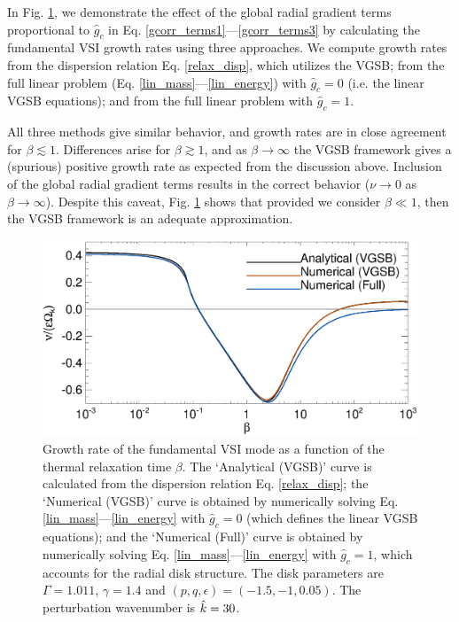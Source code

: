 In  Fig. \ref{gcorr_compare}, we demonstrate the effect of the global radial gradient terms
proportional to $\hat{g}_c$ in 
Eq. \ref{gcorr_terms1}---\ref{gcorr_terms3} by calculating the
fundamental VSI growth rates using three approaches. We compute growth rates from the dispersion
relation Eq. \ref{relax_disp}, which utilizes the VGSB;  from the
full linear problem (Eq. \ref{lin_mass}---\ref{lin_energy}) with
$\hat{g}_c=0$ (i.e. the linear VGSB equations); and from the full
linear problem with $\hat{g}_c=1$.  

All three methods give similar behavior, and growth rates are in close
agreement for $\beta\lesssim 1$. Differences arise for 
$\beta\gtrsim1$, and as $\beta\to\infty$ the VGSB framework gives a
(spurious) positive growth rate as expected from the discussion
above. Inclusion of the global radial gradient terms results in the
correct behavior  ($\nu\to0$ as $\beta\to\infty$). Despite this
caveat, Fig. \ref{gcorr_compare} shows that provided we consider
$\beta\ll1$, then the VGSB framework is an adequate approximation. 
 
\begin{figure}
  \includegraphics[width=\linewidth,clip=true,trim=0cm 0.0cm 0cm
  0cm]{figures/gcorr_compare} 
  \caption{Growth rate of the fundamental VSI mode as a function of
    the thermal relaxation time $\beta$. The `Analytical (VGSB)' curve
    is calculated from the dispersion relation Eq. \ref{relax_disp};
    the `Numerical (VGSB)' curve is obtained by numerically solving
    Eq. \ref{lin_mass}---\ref{lin_energy} with $\hat{g}_c=0$
    (which defines the linear VGSB equations); and the `Numerical
    (Full)' curve is obtained by numerically solving
    Eq. \ref{lin_mass}---\ref{lin_energy}  with $\hat{g}_c=1$, which
    accounts for the radial disk structure.  
    The disk parameters are $\Gamma=1.011$,
    $\gamma=1.4$ and $(p,q,\epsilon)=(-1.5,-1,0.05)$. The perturbation
    wavenumber is $\hat{k}=30$. 
    \label{gcorr_compare}}  
\end{figure}






